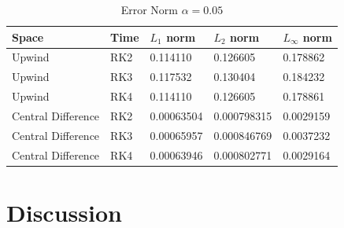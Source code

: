 \documentclass[a4paper,12pt]{report}
\begin{document}
\begin{table}
\begin{center}
	\begin{tabular}{| l | l | l | l | l |}
	\hline
	\textbf{Space} & \textbf{Time} & \textbf{$L_1$ norm} & \textbf{$L_2$ norm} & \textbf{$L_{\infty}$ norm} \\ \hline
	Upwind & RK2 & 0.114110 & 0.126605 & 0.178862 \\ \hline
	Upwind & RK3 & 0.117532 & 0.130404 & 0.184232 \\ \hline
	Upwind & RK4 & 0.114110 & 0.126605 & 0.178861 \\ \hline
	Central Difference & RK2 & 0.00063504 & 0.000798315 & 0.0029159 \\ \hline
	Central Difference & RK3 & 0.00065957 & 0.000846769 & 0.0037232 \\ \hline
	Central Difference & RK4 & 0.00063946 & 0.000802771 & 0.0029164 \\ \hline
	\end{tabular}
\end{center}
\caption{Error Norm $\alpha=0.05$}
\label{normtab}
\end{table}
\section{Discussion}
\end{document}
